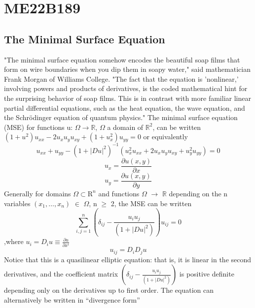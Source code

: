 \section{ME22B189}
\subsection{The Minimal Surface Equation}
"The minimal surface equation somehow encodes the beautiful soap films that form on wire boundaries when you dip them in soapy water," said mathematician Frank Morgan of Williams College. "The fact that the equation is 'nonlinear,' involving powers and products of derivatives, is the coded mathematical hint for the surprising behavior of soap films. This is in contrast with more familiar linear partial differential equations, such as the heat equation, the wave equation, and the Schrödinger equation of quantum physics."
The minimal surface equation (MSE) \cite{Simon1997} for functions u: $\Omega \rightarrow \mathbb{R}$,  $\Omega$ a domain of $\mathbb{R}^2$, can be written
$\left( {1 + u_{}^2} \right){u_{xx}} - 2{u_x}{u_y}{u_{xy}} + \left( {1 + u_x^2} \right){u_{yy}} = 0$
or equivalently
\begin{equation}
 {u_{xx}} + {u_{yy}} - {\left( {1 + |Du{|^2}} \right)^{ - 1}}\left( {u_x^2{u_{xx}} + 2{u_x}{u_y}{u_{xy}} + u_y^2{u_{yy}}} \right) = 0 
\end{equation}
\begin{equation}
    {u_x} = \frac{{\partial u\left( {x,y} \right)}}{{\partial x}}
\end{equation} 
\begin{equation}
    {u_y} = \frac{{\partial u\left( {x,y} \right)}}{{\partial y}} 
\end{equation}
Generally for domains $\Omega \subset\mathrm{R}^n$ and functions $\Omega$ $\rightarrow$ \begin{math}\mathbb{R}\end{math} depending on the n variables $(x_1, …, x_n)$ $\in$  $\Omega$, n $\geq$ 2, the MSE can be written 
\begin{equation}
\sum\limits_{i,j = 1}^n {\left( {{\delta _{ij}} - \frac{{{u_i}{u_j}}}{{\left( {1 + |Du{|^2}} \right)}}} \right){u_{ij}} = 0}
\end{equation}
,where ${u_i} = {D_i}u \equiv \frac{{\partial u}}{{\partial {x^i}}}$
\begin{equation}
u_{ij} = D_i D_j u   
\end{equation} Notice that this is a quasilinear elliptic equation: that is, it is linear in the second derivatives, and the coefficient matrix $\left( {{\delta _{ij}} - \frac{{{u_i}{u_j}}}{{\left( {1 + |Du{|^2}} \right)}}} \right)$ is positive definite depending only on the derivatives up to first order. The equation can alternatively be written in “divergence form”
